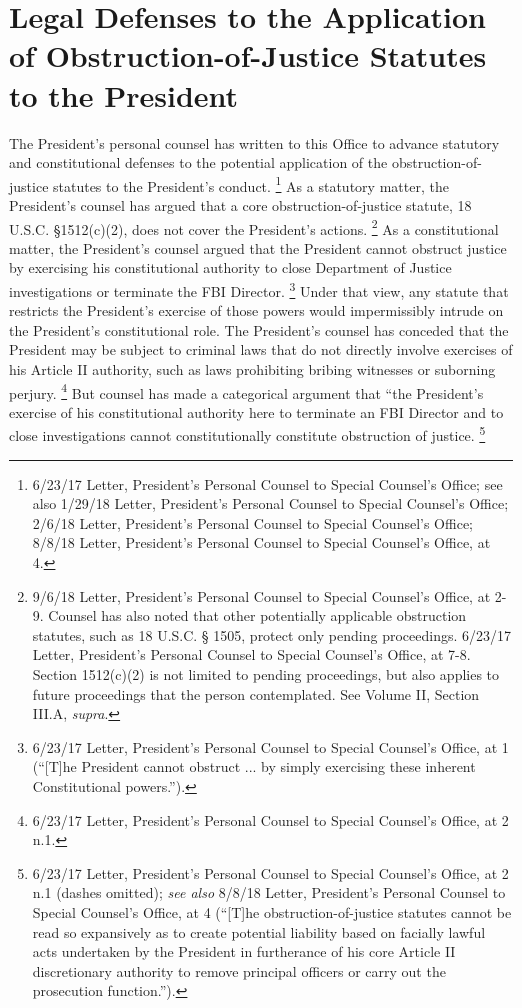 \section{Legal Defenses to the Application of Obstruction-of-Justice Statutes to the President}

The President’s personal counsel has written to this Office to advance statutory and constitutional defenses to the potential application of the obstruction-of-justice statutes to the President’s conduct.%
\footnote{6/23/17 Letter, President’s Personal Counsel to Special Counsel’s Office;
see also 1/29/18 Letter, President’s Personal Counsel to Special Counsel’s Office;
2/6/18 Letter, President’s Personal Counsel to Special Counsel’s Office;
8/8/18 Letter, President’s Personal Counsel to Special Counsel’s Office, at 4.}
As a statutory matter, the President’s counsel has argued that a core obstruction-of-justice statute, 18 U.S.C. \S 1512(c)(2), does not cover the President’s actions.%
\footnote{9/6/18 Letter, President’s Personal Counsel to Special Counsel’s Office, at 2-9.
Counsel has also noted that other potentially applicable obstruction statutes, such as 18 U.S.C. § 1505, protect only pending proceedings.
6/23/17 Letter, President’s Personal Counsel to Special Counsel’s Office, at 7-8.
Section 1512(c)(2) is not limited to pending proceedings, but also applies to future proceedings that the person contemplated.
See Volume II, Section III.A, \textit{supra}.}
As a constitutional matter, the President’s counsel argued that the President cannot obstruct justice by exercising his constitutional authority to close Department of Justice investigations or terminate the FBI Director.%
\footnote{6/23/17 Letter, President’s Personal Counsel to Special Counsel’s Office, at 1 (“[T]he President cannot obstruct ... by simply exercising these inherent Constitutional powers.”).}
Under that view, any statute that restricts the President’s exercise of those powers would impermissibly intrude on the President’s constitutional role.
The President’s counsel has conceded that the President may be subject to criminal laws that do not directly involve exercises of his Article II authority, such as laws prohibiting bribing witnesses or suborning perjury.%
\footnote{6/23/17 Letter, President’s Personal Counsel to Special Counsel’s Office, at 2 n.1.}
But counsel has made a categorical argument that “the President’s exercise of his constitutional authority here to terminate an FBI Director and to close investigations cannot constitutionally constitute obstruction of justice.%
\footnote{6/23/17 Letter, President’s Personal Counsel to Special Counsel’s Office, at 2 n.1 (dashes omitted);
\textit{see also} 8/8/18 Letter, President’s Personal Counsel to Special Counsel’s Office, at 4 (“[T]he obstruction-of-justice statutes cannot be read so expansively as to create potential liability based on facially lawful acts undertaken by the President in furtherance of his core Article II discretionary authority to remove principal officers or carry out the prosecution function.”).}

